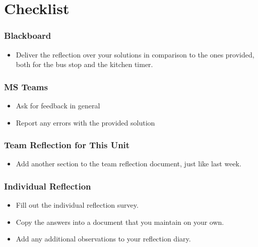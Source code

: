 \documentclass[10pt, twoside, twocolumn]{book}
\providecommand{\tightlist}{%
  \setlength{\itemsep}{0pt}\setlength{\parskip}{0pt}}
\begin{document}
\hypertarget{checklist}{%
\section{Checklist}\label{checklist}}

\hypertarget{blackboard}{%
\subsubsection{Blackboard}\label{blackboard}}

\begin{itemize}
\tightlist
\item
  Deliver the reflection over your solutions in comparison to the ones
  provided, both for the bus stop and the kitchen timer.
\end{itemize}

\hypertarget{ms-teams}{%
\subsubsection{MS Teams}\label{ms-teams}}

\begin{itemize}
\tightlist
\item
  Ask for feedback in general
\item
  Report any errors with the provided solution
\end{itemize}

\hypertarget{team-reflection-for-this-unit}{%
\subsubsection{Team Reflection for This
Unit}\label{team-reflection-for-this-unit}}

\begin{itemize}
\tightlist
\item
  Add another section to the team reflection document, just like last
  week.
\end{itemize}

\hypertarget{individual-reflection}{%
\subsubsection{Individual Reflection}\label{individual-reflection}}

\begin{itemize}
\tightlist
\item
  Fill out the individual reflection survey.
\item
  Copy the answers into a document that you maintain on your own.
\item
  Add any additional observations to your reflection diary.
\end{itemize}
\end{document}
